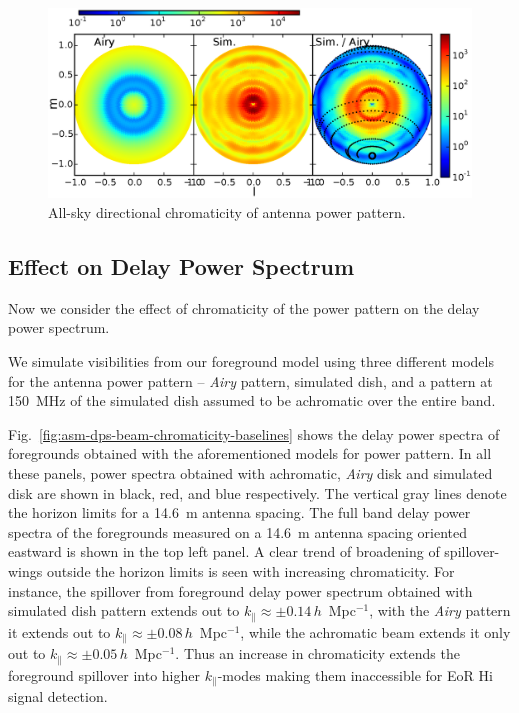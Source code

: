 \documentclass[preprint2,iop,numberedappendix,twocolappendix,appendixfloats]{emulateapj}
\begin{document}
\begin{figure}[htb]
\centering
\includegraphics[width=\linewidth]{directional_high_delay_average_in_beam.eps}
\caption{All-sky directional chromaticity of antenna power pattern. }
\label{fig:directional-beam-chromaticity}
\end{figure}

\subsection{Effect on Delay Power Spectrum}\label{sec:chromaticity-delay-spectrum}

Now we consider the effect of chromaticity of the power pattern on the delay power spectrum. 

We simulate visibilities from our foreground model using three different models for the antenna power pattern -- {\it Airy} pattern, simulated dish, and a pattern at 150~MHz of the simulated dish assumed to be achromatic over the entire band. 

Fig.~\ref{fig:asm-dps-beam-chromaticity-baselines} shows the delay power spectra of foregrounds obtained with the aforementioned models for power pattern. In all these panels, power spectra obtained with achromatic, {\it Airy} disk and simulated disk are shown in black, red, and blue respectively. The vertical gray lines denote the horizon limits for a 14.6~m antenna spacing. The full band delay power spectra of the foregrounds measured on a 14.6~m antenna spacing oriented eastward is shown in the top left panel. A clear trend of broadening of spillover-wings outside the horizon limits is seen with increasing chromaticity. For instance, the spillover from foreground delay power spectrum obtained with simulated dish pattern extends out to $k_\parallel \approx \pm 0.14\,h$~Mpc$^{-1}$, with the {\it Airy} pattern it extends out to $k_\parallel \approx \pm 0.08\,h$~Mpc$^{-1}$, while the achromatic beam extends it only out to $k_\parallel \approx \pm 0.05\,h$~Mpc$^{-1}$. Thus an increase in chromaticity extends the foreground spillover into higher $k_\parallel$-modes making them inaccessible for EoR H{\sc i} signal detection.
\end{document}
